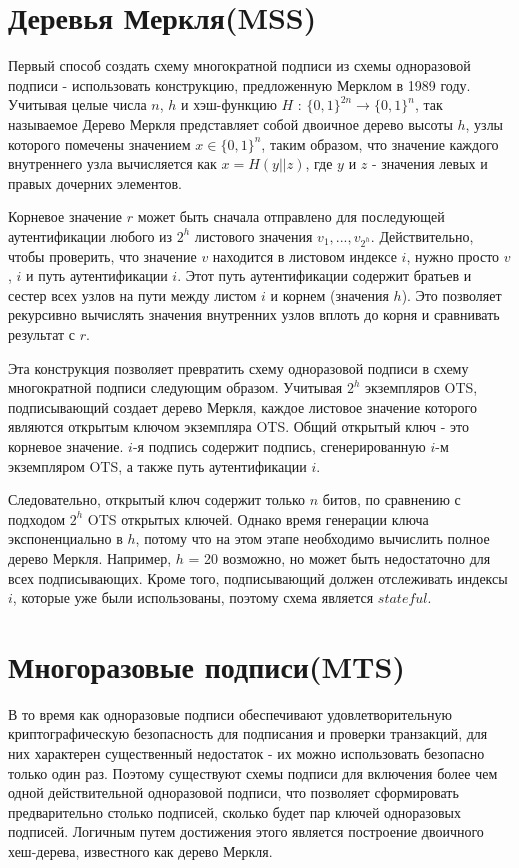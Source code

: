 \documentclass[a4paper, 14pt]{extarticle}
\begin{document}
\section{Деревья Меркля(MSS)}
Первый способ создать схему многократной подписи из схемы одноразовой подписи - использовать конструкцию, предложенную Мерклом в 1989 году. Учитывая целые числа $n$, $h$ и хэш-функцию $H$ : $\{0, 1\}^{2n} \rightarrow \{0, 1\}^{n}$, так называемое Дерево Меркля представляет собой двоичное дерево высоты $h$, узлы которого помечены значением $x \in \{0, 1\}^{n}$, таким образом, что значение каждого внутреннего узла вычисляется как $x = H(y||z)$, где $y$ и $z$ - значения левых и правых дочерних элементов.

Корневое значение $r$ может быть сначала отправлено для последующей аутентификации любого из $2^{h}$ листового значения $v_{1}, ..., v_{2^h}$. Действительно, чтобы проверить, что значение $v$ находится в листовом индексе $i$, нужно просто $v$, $i$ и путь аутентификации $i$. Этот путь аутентификации содержит братьев и сестер всех узлов на пути между листом $i$ и корнем (значения $h$). Это позволяет рекурсивно вычислять значения внутренних узлов вплоть до корня и сравнивать результат с $r$.

Эта конструкция позволяет превратить схему одноразовой подписи в схему многократной подписи следующим образом. Учитывая $2^h$ экземпляров OTS, подписывающий создает дерево Меркля, каждое листовое значение которого являются открытым ключом экземпляра OTS. Общий открытый ключ - это корневое значение. $i$-я подпись содержит подпись, сгенерированную $i$-м экземпляром OTS, а также путь аутентификации $i$.

Следовательно, открытый ключ содержит только $n$ битов, по сравнению с подходом $2^h$ OTS открытых ключей. Однако время генерации ключа экспоненциально в $h$, потому что на этом этапе необходимо вычислить полное дерево Меркля. Например, $h$ = 20 возможно, но может быть недостаточно для всех подписывающих. Кроме того, подписывающий должен отслеживать индексы $i$, которые уже были использованы, поэтому схема является $stateful$.
\newpage

\section{Многоразовые подписи(MTS)}
В то время как одноразовые подписи обеспечивают удовлетворительную криптографическую безопасность для подписания и проверки транзакций, для них характерен существенный недостаток - их можно использовать безопасно только один раз. Поэтому существуют схемы подписи для включения более чем одной действительной одноразовой подписи, что позволяет сформировать предварительно столько подписей, сколько будет пар ключей одноразовых подписей. Логичным путем достижения этого является построение двоичного хеш-дерева, известного как дерево Меркля.
\end{document}
